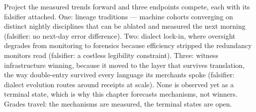 Project the measured trends forward and three endpoints compete, each with its falsifier attached. One: lineage traditions --- machine cohorts converging on distinct nightly disciplines that can be ablated and measured the next morning (falsifier: no next-day error difference). Two: dialect lock-in, where oversight degrades from monitoring to forensics because efficiency stripped the redundancy monitors read (falsifier: a costless legibility constraint). Three: witness infrastructure winning, because it moved to the layer that survives translation, the way double-entry survived every language its merchants spoke (falsifier: dialect evolution routes around receipts at scale). None is observed yet as a terminal state, which is why this chapter forecasts mechanisms, not winners. Grades travel: the mechanisms are measured, the terminal states are open.
